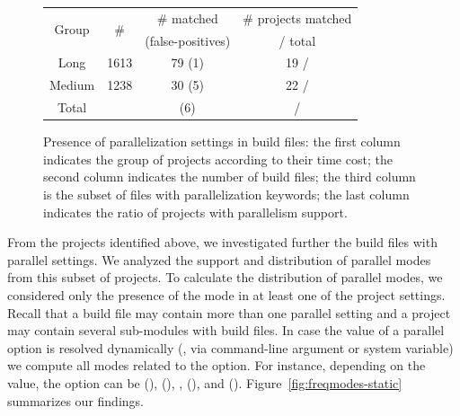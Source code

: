 \begin{figure}[ht!]
    \centering
    \begin{tabular*}{0.48\textwidth}{@{\extracolsep{\fill}}cccc}
        \toprule
        \multirow{2}{*}{Group} %
            & \multirow{2}{*}{\# \pomf{}}
            & \# \pomf{} matched
            & \# projects matched\\%
            & %
            & (false-positives)
            & / total\\%
        \midrule%
        Long   & 1613 & 79 (1) & 19 / \numLong{}\\%
        Medium & 1238 & 30 (5) & 22 / \numMed{}\\%
        \midrule%
        Total %
            & \pomMedLong{}
            & \numPomMatched{} (6)
            & \numProjectsPar{} / \numMedLong{}\\%
        \bottomrule%
    \end{tabular*}
    \caption{Presence of parallelization settings in build files: the
    first column indicates the group of projects according to their
    time cost; the second column indicates the number of build files;
    the third column is the subset of files with parallelization
    keywords; the last column indicates the ratio of projects with
    parallelism support.}
    \label{tab:inspection-table} 
\end{figure}

From the \numProjectsPar{} projects identified above, we investigated
further the \numPomMatchedValid{} build files with parallel settings.
We analyzed the support and distribution of parallel modes from this
subset of projects. To calculate the distribution of parallel modes,
we considered only the presence of the mode in at least one of the
project settings.  Recall that a build file may contain more than one
parallel setting and a project may contain several sub-modules with
build files.  In case the value of a parallel option is resolved
dynamically (\eg, via command-line argument or system variable) we
compute all modes related to the option. For instance, depending on
the value, the  option can be \Seq{} (),
\ParClassSeqMeth{} (), \SeqClassParMeth{},
(), and \ParClassParMeth{} ().
Figure~\ref{fig:freqmodes-static} summarizes our findings.  

